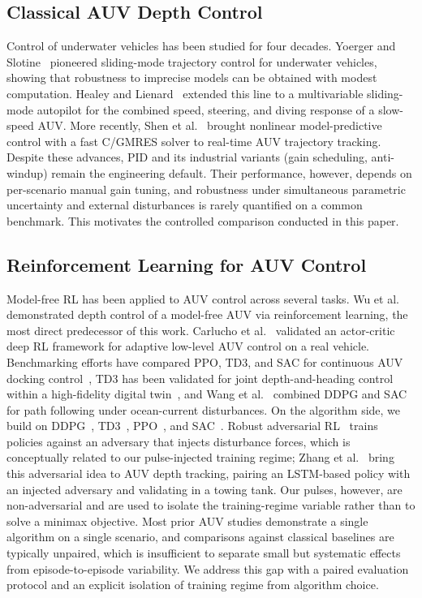 \documentclass[conference]{IEEEtran}
\begin{document}
\subsection{Classical AUV Depth Control}
Control of underwater vehicles has been studied for four decades. Yoerger and Slotine~\cite{yoerger1985robust} pioneered sliding-mode trajectory control for underwater vehicles, showing that robustness to imprecise models can be obtained with modest computation. Healey and Lienard~\cite{healey1993sliding} extended this line to a multivariable sliding-mode autopilot for the combined speed, steering, and diving response of a slow-speed AUV. More recently, Shen et al.~\cite{shen2017nmpc} brought nonlinear model-predictive control with a fast C/GMRES solver to real-time AUV trajectory tracking. Despite these advances, PID and its industrial variants (gain scheduling, anti-windup) remain the engineering default. Their performance, however, depends on per-scenario manual gain tuning, and robustness under simultaneous parametric uncertainty and external disturbances is rarely quantified on a common benchmark. This motivates the controlled comparison conducted in this paper.

\subsection{Reinforcement Learning for AUV Control}
Model-free RL has been applied to AUV control across several tasks. Wu et al.~\cite{wu2017depth} demonstrated depth control of a model-free AUV via reinforcement learning, the most direct predecessor of this work. Carlucho et al.~\cite{carlucho2018adaptive} validated an actor-critic deep RL framework for adaptive low-level AUV control on a real vehicle. Benchmarking efforts have compared PPO, TD3, and SAC for continuous AUV docking control~\cite{patil2021docking}, TD3 has been validated for joint depth-and-heading control within a high-fidelity digital twin~\cite{lin2025docking}, and Wang et al.~\cite{wang2021auv} combined DDPG and SAC for path following under ocean-current disturbances. On the algorithm side, we build on DDPG~\cite{lillicrap2016ddpg}, TD3~\cite{fujimoto2018td3}, PPO~\cite{schulman2017ppo}, and SAC~\cite{haarnoja2018sac}. Robust adversarial RL~\cite{pinto2017rarl} trains policies against an adversary that injects disturbance forces, which is conceptually related to our pulse-injected training regime; Zhang et al.~\cite{zhang2024adversarial} bring this adversarial idea to AUV depth tracking, pairing an LSTM-based policy with an injected adversary and validating in a towing tank. Our pulses, however, are non-adversarial and are used to isolate the training-regime variable rather than to solve a minimax objective. Most prior AUV studies demonstrate a single algorithm on a single scenario, and comparisons against classical baselines are typically unpaired, which is insufficient to separate small but systematic effects from episode-to-episode variability. We address this gap with a paired evaluation protocol and an explicit isolation of training regime from algorithm choice.
\end{document}

